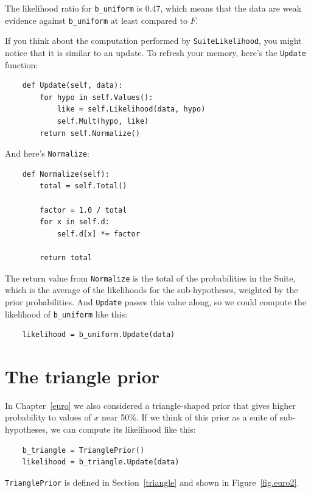 \documentclass[12pt]{book}
\begin{document}
The likelihood ratio for \verb"b_uniform" is 0.47, which means
that the data are weak evidence against \verb"b_uniform" at
least compared to $F$.

If you think about the computation performed by
\verb"SuiteLikelihood", you might notice that it is similar to an
update.  To refresh your memory, here's the {\tt Update} function:

\begin{verbatim}
    def Update(self, data):
        for hypo in self.Values():
            like = self.Likelihood(data, hypo)
            self.Mult(hypo, like)
        return self.Normalize()
\end{verbatim}

And here's {\tt Normalize}:

\begin{verbatim}
    def Normalize(self):
        total = self.Total()
        
        factor = 1.0 / total
        for x in self.d:
            self.d[x] *= factor

        return total
\end{verbatim}

The return value from {\tt Normalize} is the total of the probabilities
in the Suite, which is the average of the likelihoods for the
sub-hypotheses, weighted by the prior probabilities.  And {\tt Update}
passes this value along, so we could compute the likelihood
of \verb"b_uniform" like this:

\begin{verbatim}
    likelihood = b_uniform.Update(data)
\end{verbatim}



\section{The triangle prior}

In Chapter~\ref{euro} we also considered a triangle-shaped prior that
gives higher probability to values of $x$ near 50\%.  If we think of
this prior as a suite of sub-hypotheses, we can compute its likelihood
like this:

\begin{verbatim}
    b_triangle = TrianglePrior()
    likelihood = b_triangle.Update(data)
\end{verbatim}

{\tt TrianglePrior} is defined in Section~\ref{triangle} and
shown in Figure~\ref{fig.euro2}.
\end{document}
